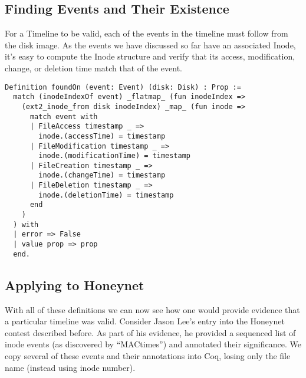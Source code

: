 \documentclass[nocopyrightspace]{sigplanconf}
\begin{document}
\subsection{Finding Events and Their Existence}

For a Timeline to be valid, each of the events in the timeline must follow
from the disk image. As the events we have discussed so far have an associated
Inode, it's easy to compute the Inode structure and verify that its access,
modification, change, or deletion time match that of the event.

\begin{lstlisting}
Definition foundOn (event: Event) (disk: Disk) : Prop :=
  match (inodeIndexOf event) _flatmap_ (fun inodeIndex =>
    (ext2_inode_from disk inodeIndex) _map_ (fun inode =>
      match event with
      | FileAccess timestamp _ => 
        inode.(accessTime) = timestamp
      | FileModification timestamp _ => 
        inode.(modificationTime) = timestamp
      | FileCreation timestamp _ => 
        inode.(changeTime) = timestamp
      | FileDeletion timestamp _ => 
        inode.(deletionTime) = timestamp
      end
    )
  ) with
  | error => False
  | value prop => prop
  end.
\end{lstlisting}

\subsection{Applying to Honeynet}
With all of these definitions we can now see how one would provide evidence
that a particular timeline was valid. Consider Jason Lee's entry\cite{lee}
into the Honeynet contest described before. As part of his evidence, he
provided a sequenced list of inode events (as discovered by ``MACtimes'') and
annotated their significance. We copy several of these events and their
annotations into Coq, losing only the file name (instead using inode number).
\end{document}

